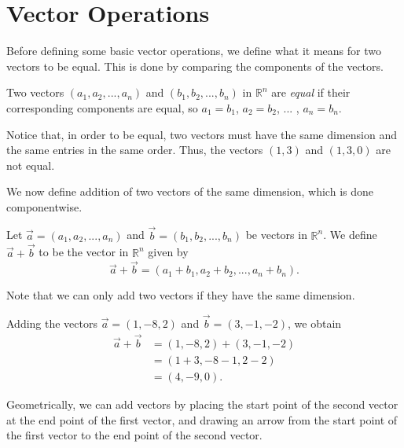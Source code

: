 \documentclass{ximera}
\begin{document}
\section*{Vector Operations}

Before defining some basic vector operations, we define what it means for two vectors to be equal. This is done by comparing the components of the vectors.

\begin{definition}
Two vectors $(a_1,a_2,...,a_n)$ and $(b_1,b_2,...,b_n)$ in $\mathbb{R}^n$ are \emph{equal} if their corresponding components are equal, so $a_1=b_1$, $a_2=b_2$, ... , $a_n = b_n$.
\end{definition}

Notice that, in order to be equal, two vectors must have the same dimension and the same entries in the same order. Thus, the vectors $(1,3)$ and $(1,3,0)$ are not equal.

We now define addition of two vectors of the same dimension, which is done componentwise.

\begin{definition}
Let $\vec{a}=(a_1,a_2,...,a_n)$ and $\vec{b}=(b_1,b_2,...,b_n)$ be vectors in $\mathbb{R}^n$. We define $\vec{a}+\vec{b}$ to be the vector in $\mathbb{R}^n$ given by
\[
\vec{a}+\vec{b} = (a_1+b_1,a_2+b_2,...,a_n+b_n).
\]
\end{definition}

Note that we can only add two vectors if they have the same dimension.

\begin{example}
Adding the vectors $\vec{a} = (1,-8,2)$ and $\vec{b} = (3,-1,-2)$, we obtain
\begin{align*}
\vec{a}+\vec{b} &= (1,-8,2)+(3,-1,-2)\\
 &= (1+3,-8-1,2-2)\\
 &= (4,-9,0).
\end{align*}
\end{example}

Geometrically, we can add vectors by placing the start point of the second vector at the end point of the first vector, and drawing an arrow from the start point of the first vector to the end point of the second vector.
\end{document}
